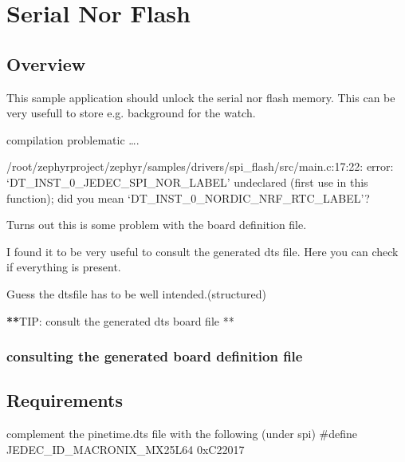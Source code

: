 \documentclass[letterpaper,10pt,english]{sphinxmanual}
\begin{document}
\section{Serial Nor Flash}
\label{\detokenize{drivers/spinor:serial-nor-flash}}\label{\detokenize{drivers/spinor::doc}}
\begin{sphinxVerbatim}[commandchars=\\\{\}]
\end{sphinxVerbatim}


\subsection{Overview}
\label{\detokenize{drivers/spinor:overview}}
This sample application should unlock the serial nor flash memory.
This can be very usefull to store e.g. background for the watch.

compilation problematic ….

/root/zephyrproject/zephyr/samples/drivers/spi\_flash/src/main.c:17:22: error: ‘DT\_INST\_0\_JEDEC\_SPI\_NOR\_LABEL’ undeclared (first use in this function); did you mean ‘DT\_INST\_0\_NORDIC\_NRF\_RTC\_LABEL’?

Turns out this is some problem with the board definition file.

I found it to be very useful to consult the generated dts file.
Here you can check if everything is present.

Guess the dts\sphinxhyphen{}file has to be well intended.(structured)

{\color{red}\bfseries{}**}TIP: consult the generated dts board file **


\subsubsection{consulting the generated board definition file}
\label{\detokenize{drivers/spinor:consulting-the-generated-board-definition-file}}
\begin{sphinxVerbatim}[commandchars=\\\{\}]
\end{sphinxVerbatim}


\subsection{Requirements}
\label{\detokenize{drivers/spinor:requirements}}
complement the pinetime.dts file with the following (under spi)
\#define JEDEC\_ID\_MACRONIX\_MX25L64      0xC22017
\end{document}
